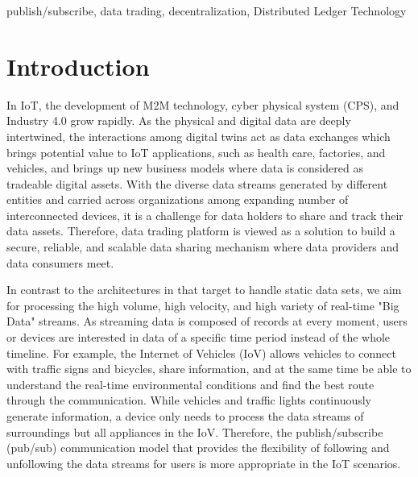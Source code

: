 \documentclass[conference]{IEEEtran}
\begin{document}
\begin{IEEEkeywords}
publish/subscribe, data trading, decentralization, Distributed Ledger Technology
\end{IEEEkeywords}

\section{Introduction}
In IoT, the development of M2M technology\cite{M2M}, cyber physical system (CPS)\cite{CPS}, and Industry 4.0 grow rapidly. As the physical and digital data are deeply intertwined, the interactions among digital twins act as data exchanges\cite{digitaltwin} which brings potential value to IoT applications, such as health care\cite{healthCare}, factories, and vehicles\cite{AutonomousDriving}, and brings up new business models where data is considered as tradeable digital assets. With the diverse data streams generated by different entities and carried across organizations among expanding number of interconnected devices, it is a challenge for data holders to share and track their data assets. Therefore, data trading platform is viewed as a solution to build a secure, reliable, and scalable data sharing mechanism where data providers and data consumers meet.

In contrast to the architectures in \cite{DIaas, MARSA} that target to handle static data sets, we aim for processing the high volume, high velocity, and high variety of real-time "Big Data" streams\cite{BigData}. As streaming data is composed of records at every moment, users or devices are interested in data of a specific time period instead of the whole timeline. For example, the Internet of Vehicles (IoV) allows vehicles to connect with traffic signs and bicycles, share information, and at the same time be able to understand the real-time environmental conditions and find the best route through the communication. While vehicles and traffic lights continuously generate information, a device only needs to process the data streams of surroundings but all appliances in the IoV. Therefore, the publish/subscribe (pub/sub) communication model that provides the flexibility of following and unfollowing the data streams for users is more appropriate in the IoT scenarios.
\end{document}
